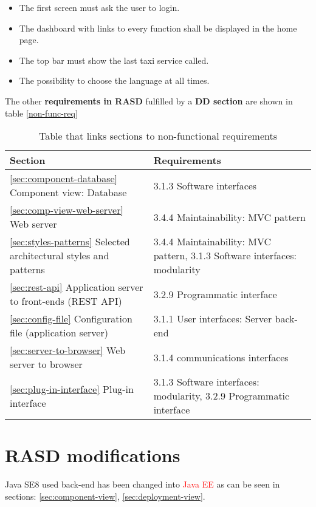 \begin{itemize}
\item The first screen must ask the user to login.
\item The dashboard with links to every function shall be displayed in the home page.
\item The top bar must show the last taxi service called.
\item The possibility to choose the language at all times.
\end{itemize}

The other {\bf requirements in RASD} fulfilled by a {\bf DD section} are shown in table \autoref{non-func-req}




\begin{table}[h]
\begin{center}
\begin{tabular}{|p{}|p{}|}
\hline
{\bf Section}  & {\bf Requirements}\\
\hline
\autoref{sec:component-database} Component view: Database & 
3.1.3 Software interfaces\\
\hline
\autoref{sec:comp-view-web-server} Web server & 3.4.4 Maintainability: MVC pattern \\
\hline
\autoref{sec:styles-patterns} Selected architectural styles and patterns &  3.4.4 Maintainability: MVC pattern, 3.1.3 Software interfaces: modularity \\
\hline
\autoref{sec:rest-api} Application server to front-ends (REST API) & 3.2.9 Programmatic interface \\
\hline
\autoref{sec:config-file} Configuration file (application server) & 3.1.1 User interfaces: Server back-end \\
\hline
\autoref{sec:server-to-browser} Web server to browser & 3.1.4 communications interfaces \\
\hline
\autoref{sec:plug-in-interface} Plug-in interface & 3.1.3 Software interfaces: modularity, 3.2.9 Programmatic interface \\
\hline

\end{tabular}
\caption{Table that links sections to non-functional requirements}
\label{non-func-req}
\end{center}
\end{table}

\section{RASD modifications}
\label{RASD-changes}
Java SE8 used back-end has been changed into \textcolor{red}{Java EE} as can be seen in sections: \ref{sec:component-view}, \ref{sec:deployment-view}.








